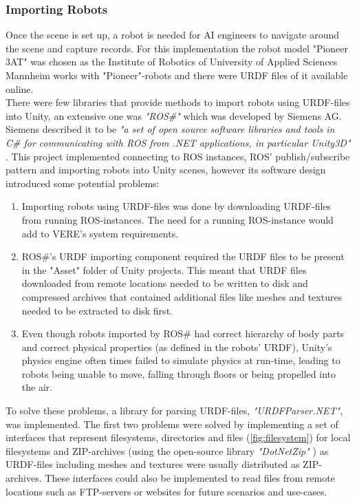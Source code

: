 \subsubsection{Importing Robots}
Once the scene is set up, a robot is needed for \acs{AI} engineers to navigate around the scene and capture records. For this implementation the robot model "Pioneer 3AT" was chosen as the Institute of Robotics of University of Applied Sciences Mannheim works with "Pioneer"-robots and there were \ac{URDF} files of it available \cite{AmrRosConfig} online.\\
There were few libraries that provide methods to import robots using URDF-files into Unity, an extensive one was \emph{"ROS\#"} which was developed by Siemens AG. Siemens described it to be \textit{"a set of open source software libraries and tools in C\# for communicating with ROS from .NET applications, in particular Unity3D"} \cite{RosSharp}. This project implemented connecting to ROS instances, ROS' publish/subscribe pattern and importing robots into Unity scenes, however its software design introduced some potential problems: 
\begin{enumerate}
    \item Importing robots using URDF-files was done by downloading URDF-files from running ROS-instances. The need for a running ROS-instance would add to \ac{VERE}'s system requirements.
    \item ROS\#'s URDF importing component required the URDF files to be present in the "Asset" folder of Unity projects. This meant that URDF files downloaded from remote locations needed to be written to disk and compressed archives that contained additional files like meshes and textures needed to be extracted to disk first.
    \item Even though robots imported by ROS\# had correct hierarchy of body parts and correct physical properties (as defined in the robots' URDF), Unity's physics engine often times failed to simulate physics at run-time, leading to robots being unable to move, falling through floors or being propelled into the air.
\end{enumerate}
To solve these problems, a library for parsing URDF-files, \emph{"URDFParser.NET"}, was implemented. The first two problems were solved by implementing a set of interfaces that represent filesystems, directories and files (\ref{fig:filesystem}) for local filesystems and ZIP-archives (using the open-source library \emph{"DotNetZip"} \cite{DotNetZip}) as URDF-files including meshes and textures were usually distributed as ZIP-archives. These interfaces could also be implemented to read files from remote locations such as FTP-servers or websites for future scenarios and use-cases.
